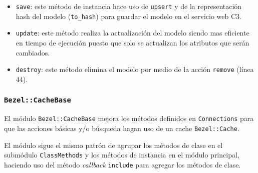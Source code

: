 \begin{itemize}
\item \texttt{save}: este método de instancia hace uso de \texttt{upsert}
  y de la representación hash del modelo (\texttt{to\_hash}) para
  guardar el modelo en el servicio web C3.
\item \texttt{update}: este método realiza la actualización del modelo
  siendo mas eficiente en tiempo de ejecución puesto que solo se actualizan
  los atributos que serán cambiados.
\item \texttt{destroy}: este método elimina el modelo por medio de la acción
  \texttt{remove} (línea 44).
\end{itemize}

\subsubsection{\texttt{Bezel::CacheBase}}

El módulo \texttt{Bezel::CacheBase} mejora los métodos definidos en
\texttt{Connections} para que las acciones básicas y/o búsqueda hagan uso de un
cache \texttt{Bezel::Cache}.

El módulo sigue el mismo patrón de agrupar los métodos de clase en el submódulo
\texttt{ClassMethods} y los métodos de instancia en el módulo principal, haciendo
uso del método \textit{callback} \texttt{include} para agregar los métodos de clase.


